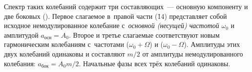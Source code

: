
Спектр таких колебаний содержит три составляющих~--- основную компоненту и две боковых (). Первое слагаемое в~правой части (\r{14}) представляет собой исходное немодулированное колебание с~\emph{основной (несущей) частотой} $\omega_0$ и амплитудой $a_{осн}=A_0$. Второе и третье слагаемые соответствуют новым гармоническим колебаниям с~частотами ($\omega_0+\Omega$) и ($\omega_0-\Omega$). Амплитуды этих двух колебаний одинаковы и составляют $m/2$ от амплитуды немодулированного колебания: $a_{бок}={A_0m}/{2}$. Начальные фазы всех трёх колебаний одинаковы.

